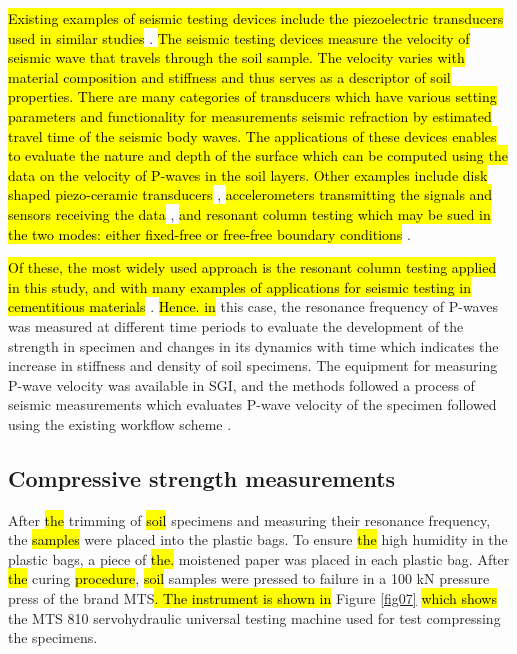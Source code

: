 \documentclass[sustainability,article,submit,pdftex,moreauthors]{Definitions/mdpi}
\begin{document}
\hl{Existing examples of seismic testing devices include the piezoelectric transducers used in similar studies} \cite{DUTTA20201269,Astuto,Brignoli}. \hl{The seismic testing devices measure the velocity of seismic wave that travels through the soil sample. The velocity varies with material composition and stiffness and thus serves as a descriptor of soil properties. There are many categories of transducers which have various setting parameters and functionality for measurements seismic refraction by estimated travel time of the seismic body waves. The applications of these devices enables to evaluate the nature and depth of the surface which can be computed using the data on the velocity of P-waves in the soil layers. Other examples include disk shaped piezo-ceramic transducers}  \cite{SUWAL2013510,Irfan}, \hl{accelerometers transmitting the signals and sensors receiving the data} \cite{SHABANI2023116589,2002121}, \hl{and resonant column testing which may be sued in the two modes: either fixed-free or free-free boundary conditions} \cite{Drnevich}. 

\hl{Of these, the most widely used approach is the resonant column testing applied in this study, and with many examples of applications for seismic testing in cementitious materials} \cite{LI2023108081,UMUTUMU2023101415,LIU2020104620,KANELLOPOULOS2022107366}. \hl{Hence. in} this case, the resonance frequency of P-waves was measured at different time periods to evaluate the development of the strength in specimen and changes in its dynamics with time which indicates the increase in stiffness and density of soil specimens. The equipment for measuring P-wave velocity was available in SGI, and the methods followed a process of seismic measurements which evaluates P-wave velocity of the specimen followed using the existing workflow scheme \cite{Lindh202224}. 

\subsection{Compressive strength measurements}

After \hl{the }trimming of \hl{soil }specimens and measuring their resonance frequency, the \hl{samples} were placed into the plastic bags. To ensure \hl{the }high humidity in the plastic bags, a piece of \hl{the. }moistened paper was placed in each plastic bag. After \hl{the }curing \hl{procedure}, \hl{soil} samples were pressed to failure in a 100 kN pressure press of the brand MTS\hl{. The instrument is shown in }Figure \ref{fig07} \hl{which shows }the MTS 810 servohydraulic universal testing machine used for test compressing the specimens. 
\end{document}
